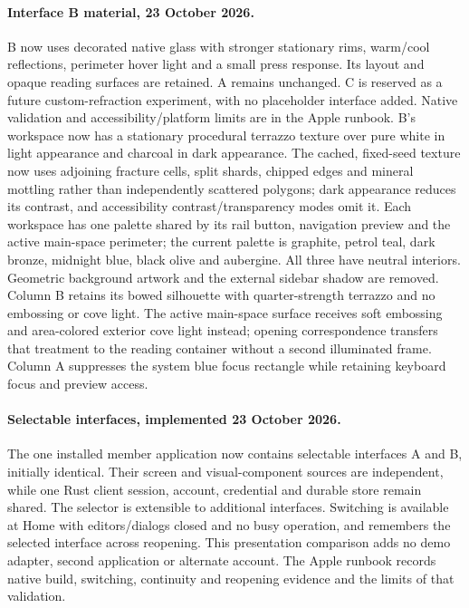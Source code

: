 \documentclass[11pt]{article}
\begin{document}
\paragraph{Interface B material, 23 October 2026.}
B now uses decorated native glass with stronger stationary rims, warm/cool
reflections, perimeter hover light and a small press response. Its layout and
opaque reading surfaces are retained. A remains unchanged. C is reserved as a
future custom-refraction experiment, with no placeholder interface added.
Native validation and accessibility/platform limits are in the Apple runbook.
B's workspace now has a stationary procedural terrazzo texture over pure white
in light appearance and charcoal in dark appearance. The cached, fixed-seed
texture now uses adjoining fracture cells, split shards, chipped edges and
mineral mottling rather than independently scattered polygons; dark appearance reduces
its contrast, and accessibility contrast/transparency modes omit it. Each workspace has one palette shared by its rail button,
navigation preview and the active main-space perimeter; the current palette is graphite, petrol
teal, dark bronze, midnight blue, black olive and aubergine. All three have
neutral interiors.
Geometric background artwork and the external sidebar shadow are removed.
Column B retains its bowed silhouette with quarter-strength terrazzo and no
embossing or cove light. The active main-space surface receives soft embossing
and area-colored exterior cove light instead; opening correspondence transfers
that treatment to the reading container without a second illuminated frame. Column A suppresses the system blue focus
rectangle while retaining keyboard focus and preview access.

\paragraph{Selectable interfaces, implemented 23 October 2026.}
The one installed member application now contains selectable interfaces A and B,
initially identical. Their screen and visual-component sources are independent,
while one Rust client session, account, credential and durable store remain shared.
The selector is extensible to additional interfaces. Switching is available at
Home with editors/dialogs closed and no busy operation, and remembers the selected
interface across reopening. This presentation comparison adds no demo adapter,
second application or alternate account. The Apple runbook records native build,
switching, continuity and reopening evidence and the limits of that validation.
\end{document}

